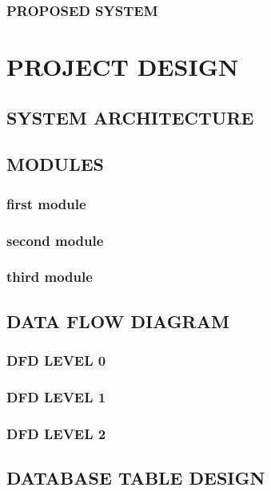 \documentclass[a4paper,12pt]{report}
\begin{document}
\subsection{PROPOSED SYSTEM}

\newpage
\chapter{PROJECT DESIGN}
\vspace{-1 cm}
\section{SYSTEM ARCHITECTURE}
\section{MODULES}
\subsection{first module}

\subsection{second module}
\subsection{third module}



\section{DATA FLOW DIAGRAM}
\subsection{DFD LEVEL 0}
\renewcommand\thefigure{\thechapter.\arabic{figure}}


\subsection{DFD LEVEL 1}

\subsection{DFD LEVEL 2}
\renewcommand\thefigure{\thechapter.\arabic{figure}}


\newpage
\section{DATABASE TABLE DESIGN}
\end{document}
